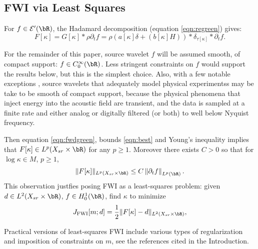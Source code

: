 \subsection{FWI via Least Squares}
For $f \in {\cal E}'(\bR)$, the Hadamard decomposition 
(equation \ref{eqn:regreen}) gives:
\begin{equation}
  \label{eqn:fwdgreen}
  F[\kappa] = G[\kappa] * \rho \partial_t f  = \rho( a[\kappa]\delta
  +  (b[\kappa]H)) *\delta_{\tau[\kappa]}*\partial_t f.
\end{equation}

For the remainder of this paper, source wavelet $f$ will be assumed
smooth, of compact support: $f \in C^{\infty}_0(\bR)$. Less stringent constraints on $f$ would
support the results below, but this is the simplest choice. Also, with
a few notable exceptions \cite[]{SondRes:83}, source wavelets that
adequately model physical experimentss may be take to be smooth of
compact support, because the physical phenomena that inject energy
into the acoustic field are transient, and the data is sampled at a
finite rate and either analog
or digitally filtered (or both) to well below Nyquist frequency.

Then equation \ref{eqn:fwdgreen}, bounds
\ref{eqn:best} and Young's inequality implies that $F[\kappa] \in
L^p(X_{sr} \times \bR)$ for any $p \ge 1$. Moreover there exists
$C>0$ so that for $\log \kappa\in M$, $p \ge 1$,
\begin{equation}
  \label{eqn:fwdnorm}
  \|F[\kappa]\|_{L^p(X_{sr} \times \bR)} \le C \left\|\partial_t f\right\|_{L^p(\bR)}.
\end{equation}
This observation justfies posing FWI as a least-squares problem: given $d \in
L^2(X_{sr}\times \bR)$, $f \in H^1_0(\bR)$, find $\kappa$ to minimize
\begin{equation}
  \label{eqn:fwi}
  J_{\rm FWI}[m;d]= \frac{1}{2}\|F[\kappa]-d\|_{L^2(X_{sr} \times \bR)},
\end{equation}

Practical versions of least-squares FWI include various types of regularization and
imposition of constraints on $m$, see the references cited in the
Introduction.

